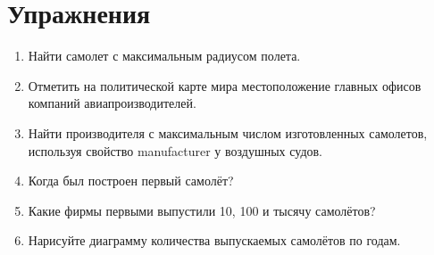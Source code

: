 \section{Упражнения}
\begin{enumerate}
\item Найти самолет с максимальным радиусом полета.
\item Отметить на политической карте мира местоположение главных офисов компаний авиапроизводителей.
\item Найти производителя с максимальным числом изготовленных самолетов, используя свойство manufacturer у воздушных судов.
\item Когда был построен первый самолёт?
\item Какие фирмы первыми выпустили 10, 100 и тысячу самолётов?
\item Нарисуйте диаграмму количества выпускаемых самолётов по годам.
\end{enumerate}
